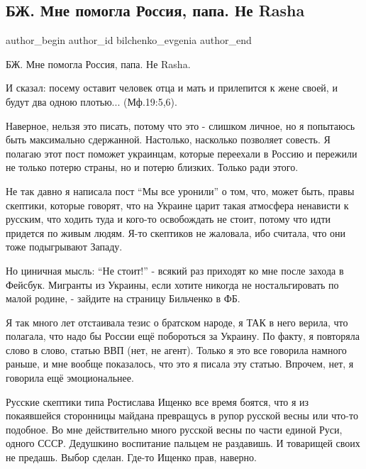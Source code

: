  
 
 
 
 
\subsection{БЖ. Мне помогла Россия, папа. Не Rasha}
\label{sec:08_01_2022.tg.bilchenko_evgenia.1.rossia_papa_rasha}

\ifcmt
 author_begin
   author_id bilchenko_evgenia
 author_end
\fi

БЖ. Мне помогла Россия, папа. Не Rasha.

И сказал: посему оставит человек отца и мать и прилепится к жене своей, и будут
два одною плотью... (Мф.19:5,6).

Наверное, нельзя это писать, потому что это - слишком личное, но я попытаюсь
быть максимально сдержанной. Настолько, насколько позволяет совесть. Я полагаю
этот пост поможет украинцам, которые переехали в Россию и пережили не только
потерю страны, но и потерю близких. Только ради этого.

Не так давно я написала пост \enquote{Мы все уронили} о том, что, может быть,
правы скептики, которые говорят, что на Украине царит такая атмосфера ненависти
к русским, что ходить туда и кого-то освобождать не стоит, потому что идти
придется по живым людям. Я-то скептиков не жаловала, ибо считала, что они тоже
подыгрывают Западу. 

Но циничная мысль: \enquote{Не стоит!} - всякий раз приходят ко мне после
захода в Фейсбук. Мигранты из Украины, если хотите никогда не ностальгировать
по малой родине, - зайдите на страницу Бильченко в ФБ.

Я так много лет отстаивала тезис о братском народе, я ТАК в него верила, что
полагала, что надо бы России ещё побороться за Украину. По факту, я повторяла
слово в слово, статью ВВП (нет, не агент). Только я это все говорила намного
раньше, и мне вообще показалось, что это я писала эту статью. Впрочем, нет, я
говорила ещё эмоциональнее. 

Русские скептики типа Ростислава Ищенко все время боятся, что я из покаявшейся
сторонницы майдана превращусь в рупор русской весны или что-то подобное. Во мне
действительно много русской весны по части единой Руси, одного СССР. Дедушкино
воспитание пальцем не раздавишь. И товарищей своих не предашь. Выбор сделан.
Где-то Ищенко прав, наверно.

